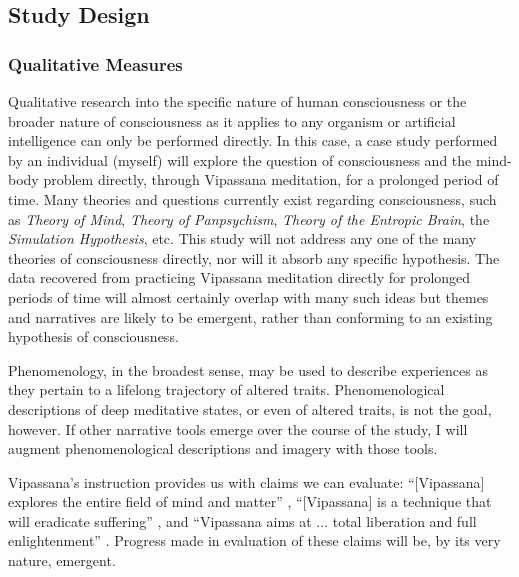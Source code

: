 \documentclass[a4paper, amsfonts, amssymb, amsmath, reprint, showkeys, nofootinbib, twoside]{revtex4-1}
\begin{document}
\subsection{Study Design}

\subsubsection{Qualitative Measures}

Qualitative research into the specific nature of human consciousness or the broader
nature of consciousness as it applies to any organism or artificial intelligence can
only be performed directly. In this case, a case study performed by an individual
(myself) will explore the question of consciousness and the mind-body problem
directly, through Vipassana meditation, for a prolonged period of time.
Many theories and questions currently exist regarding
consciousness, such as \textit{Theory of Mind}, \textit{Theory of Panpsychism},
\textit{Theory of the Entropic Brain},
the \textit{Simulation Hypothesis}, etc. This study will not address any one of the
many theories of consciousness
directly, nor will it absorb any specific hypothesis. The data recovered from
practicing Vipassana meditation directly for prolonged periods of time will almost
certainly overlap with many such ideas but themes and narratives are likely
to be emergent, rather than conforming to an existing hypothesis of consciousness.

Phenomenology, in the broadest sense, may be used to describe experiences as they
pertain to a lifelong trajectory of altered traits. Phenomenological descriptions of
deep meditative states, or even of altered traits, is not the goal,
however. If other narrative tools emerge over the course of the study, I will augment
phenomenological descriptions and imagery with those tools.

Vipassana's instruction provides us with claims we can evaluate:
``[Vipassana] explores the entire field of mind and matter'' \cite{goenka1999discourses},
``[Vipassana] is a technique that will eradicate suffering'' \cite{dhammaorg2014code},
and ``Vipassana aims at ... total liberation and full enlightenment''
\cite{dhammaorg2014code}.
Progress made in evaluation of these claims will be, by its very nature, emergent.
\end{document}
